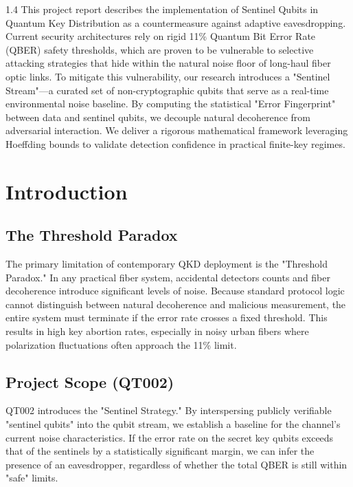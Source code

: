 \documentclass[journal,onecolumn,12pt,draftclsnofoot]{IEEEtran}
\begin{document}
\begin{spacing}{1.4}
\large
This project report describes the implementation of Sentinel Qubits in Quantum Key Distribution as a countermeasure against adaptive eavesdropping. Current security architectures rely on rigid 11\% Quantum Bit Error Rate (QBER) safety thresholds, which are proven to be vulnerable to selective attacking strategies that hide within the natural noise floor of long-haul fiber optic links. To mitigate this vulnerability, our research introduces a "Sentinel Stream"—a curated set of non-cryptographic qubits that serve as a real-time environmental noise baseline. By computing the statistical "Error Fingerprint" between data and sentinel qubits, we decouple natural decoherence from adversarial interaction. We deliver a rigorous mathematical framework leveraging Hoeffding bounds to validate detection confidence in practical finite-key regimes.
\end{spacing}

\newpage

\tableofcontents
\newpage


\section{Introduction}

\subsection{The Threshold Paradox}
The primary limitation of contemporary QKD deployment is the "Threshold Paradox." In any practical fiber system, accidental detectors counts and fiber decoherence introduce significant levels of noise. Because standard protocol logic cannot distinguish between natural decoherence and malicious measurement, the entire system must terminate if the error rate crosses a fixed threshold. This results in high key abortion rates, especially in noisy urban fibers where polarization fluctuations often approach the 11\% limit.

\subsection{Project Scope (QT002)}
QT002 introduces the "Sentinel Strategy." By interspersing publicly verifiable "sentinel qubits" into the qubit stream, we establish a baseline for the channel's current noise characteristics. If the error rate on the secret key qubits exceeds that of the sentinels by a statistically significant margin, we can infer the presence of an eavesdropper, regardless of whether the total QBER is still within "safe" limits.
\end{document}
